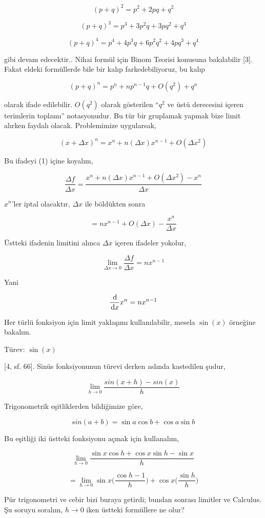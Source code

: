 \documentclass[12pt,fleqn]{article}\usepackage{../../common}
\begin{document}
$$
(p+q)^2 = p^2 + 2pq + q^2
$$

$$
(p+q)^3 = p^3 + 3 p^2 q + 3pq^2 + q^3
$$

$$
(p+q)^4 = p^4 + 4p^3 q + 6p^2 q^2 + 4p q^3 + q^4
$$

gibi devam edecektir.. Nihai formül için Binom Teorisi konusuna bakılabilir [3].
Fakat eldeki formüllerde bile bir kalıp farkedebiliyoruz, bu kalıp

$$
(p+q)^n = p^n + n p^{n-1} q + O(q^2) + q^n
$$

olarak ifade edilebilir. $O(q^2)$ olarak gösterilen ``$q^2$ ve üstü derecesini
içeren terimlerin toplamı'' notasyonudur. Bu tür bir gruplamak yapmak bize limit
alırken faydalı olacak. Problemimize uygularsak,

$$
(x+\Delta x)^n = x^n + n (\Delta x)x^{n-1} + O(\Delta x^2)
$$

Bu ifadeyi (1) içine koyalım,

$$
\frac{\Delta f}{\Delta x} =
\frac{x^n + n (\Delta x)x^{n-1} + O(\Delta x^2) - x^n}{\Delta x}
$$

$x^n$'ler iptal olacaktır, $\Delta x$ ile böldükten sonra

$$
= n x^{n-1} + O(\Delta x) - \frac{x^n}{\Delta x}
$$

Üstteki ifadenin limitini alınca $\Delta x$ içeren ifadeler yokolur,

$$
\lim_{\Delta x \to 0} \frac{\Delta f}{\Delta x} =
n x^{n-1}
$$

Yani

$$
\frac{\,\mathrm{d} }{\,\mathrm{d} x} x^n = n x^{n-1}
$$

Her türlü fonksiyon için limit yaklaşımı kullanılabilir, mesela $\sin(x)$
örneğine bakalım.

Türev: $\sin(x)$

[4, sf. 66]. Sinüs fonksiyonunun türevi derken aslında kastedilen şudur,

$$ \lim_{h \to 0} \frac{sin(x+h) - sin(x)}{h} $$

Trigonometrik eşitliklerden bildiğimize göre, 

$$ sin(a+b) = \sin a \cos b + \cos a \sin b $$

Bu eşitliği iki üstteki fonksiyonu açmak için kullanalım,

$$ \lim_{h \to 0} \frac{\sin x \cos h + \cos x \sin h - \sin x }{h} $$

$$ = \lim_{h \to 0} \sin x \bigg( \frac{\cos h - 1}{h} \bigg) + \cos x \bigg( \frac{\sin h}{h} \bigg) $$

Pür trigonometri ve cebir bizi buraya getirdi; bundan sonrası limitler ve
Calculus. Şu soruyu soralım, $h \to 0$ iken üstteki formüllere ne olur? 
\end{document}
